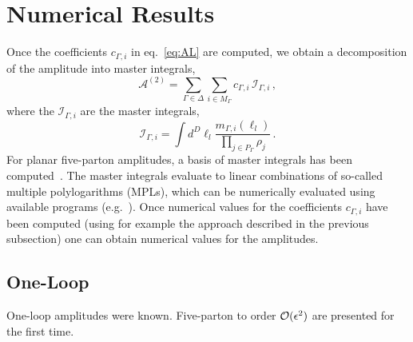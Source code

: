 \section{Numerical Results}

Once the coefficients $c_{\Gamma,i}$ in eq.~\eqref{eq:AL} are computed,
we obtain a decomposition of the amplitude into master integrals,
\begin{equation}
  \mathcal{A}^{(2)}=\sum_{\Gamma\in\Delta}
  \sum_{i\in M_\Gamma} c_{\Gamma,i}\,
  \mathcal{I}_{\Gamma,i}\,,
  \label{eq:Amaster}
\end{equation}
where the $\mathcal{I}_{\Gamma,i}$ are the master integrals,
\begin{equation}
  \mathcal{I}_{\Gamma,i}=\int d^D\ell_l
  \frac{m_{\Gamma,i}(\ell_l)}
  {\prod_{j\in P_\Gamma}\rho_j}\,.
\end{equation}
For planar five-parton amplitudes, a basis of master integrals has been 
computed~\cite{Papadopoulos:2015jft,Gehrmann:2018yef}.
The master integrals evaluate to linear combinations of so-called 
multiple polylogarithms (MPLs), which can be 
numerically evaluated using available programs 
(e.g.~\cite{Vollinga:2004sn}). Once numerical values for the coefficients 
$c_{\Gamma,i}$ have been  computed (using for example 
the approach described in the previous subsection) one can obtain numerical values
for the amplitudes.


\subsection{One-Loop}

One-loop amplitudes were known. Five-parton to order $\mathcal{O}(\epsilon^2)$ are presented for the first time.

